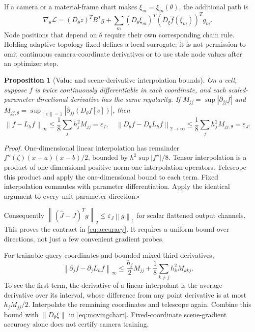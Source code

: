 \documentclass[11pt,letterpaper]{article}
\newcommand{\norm}[1]{\left\lVert#1\right\rVert}
\newtheorem{prop}{Proposition}
\newcommand{\briefproof}[1]{\textit{Proof.} #1\hfill$\square$\par}
\begin{document}
If a camera or a material-frame chart makes $\xi_m=\xi_m(\theta)$, the additional path is
\begin{equation}
 \nabla_\theta\mathcal L=(D_\theta z)^TB^Tg+
 \sum_m (D_\theta\xi_m)^T(D_\xi\widehat f(\xi_m))^Tg_m. \label{eq:movingchart}
\end{equation}
Node positions that depend on $\theta$ require their own corresponding chain rule. Holding adaptive topology fixed defines a local surrogate; it is not permission to omit continuous camera-coordinate derivatives or to use stale node values after an optimizer step.

\begin{prop}[Value and scene-derivative interpolation bounds]
On a cell, suppose $f$ is twice continuously differentiable in each coordinate, and each scaled-parameter directional derivative has the same regularity. If
$M_{jj}=\sup|\partial_{jj}f|$ and
$M_{jj,\theta}=\sup_{\norm v=1}|\partial_{jj}(D_\theta f[v])|$, then
\begin{equation}
 \norm{f-L_hf}_\infty\le\frac18\sum_jh_j^2M_{jj}=\varepsilon_I,
 \quad
 \norm{D_\theta f-D_\theta L_hf}_{2\to\infty}
 \le\frac18\sum_jh_j^2M_{jj,\theta}=\varepsilon_J. \label{eq:Ebound}
\end{equation}
\end{prop}
\briefproof{One-dimensional linear interpolation has remainder $f''(\zeta)(x-a)(x-b)/2$, bounded by $h^2\sup|f''|/8$. Tensor interpolation is a product of one-dimensional positive norm-one interpolation operators. Telescope this product and apply the one-dimensional bound to each term. Fixed interpolation commutes with parameter differentiation. Apply the identical argument to every unit parameter direction.}
Consequently $\norm{(\widehat J-J)^Tg}_2\le\varepsilon_J\norm g_1$ for scalar flattened output channels. This proves the contract in \eqref{eq:accuracy}. It requires a uniform bound over directions, not just a few convenient gradient probes.

For trainable query coordinates and bounded mixed third derivatives,
\begin{equation}
 \norm{\partial_jf-\partial_jL_hf}_\infty
 \le\frac{h_j}{2}M_{jj}+\frac18\sum_{k\ne j}h_k^2M_{kkj}. \label{eq:querybound}
\end{equation}
To see the first term, the derivative of a linear interpolant is the average derivative over its interval, whose difference from any point derivative is at most $h_jM_{jj}/2$. Interpolate the remaining coordinates and telescope again. Combine this bound with $\norm{D_\theta\xi}$ in \eqref{eq:movingchart}. Fixed-coordinate scene-gradient accuracy alone does not certify camera training.
\end{document}
